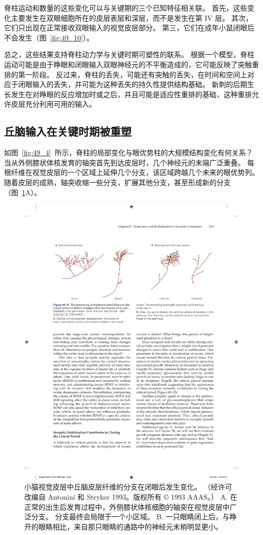 脊柱运动和数量的这些变化可以与关键期的三个已知特征相关联。
首先，这些变化主要发生在双眼细胞所在的皮层表层和深层，而不是发生在第 IV 层。
其次，它们只出现在正常接收双眼输入的视觉皮层部分。
第三，它们在成年小鼠闭眼后不会发生（图~\ref{fig:49_10}）。


总之，这些结果支持脊柱动力学与关键时期可塑性的联系。
根据一个模型，脊柱运动可能是由于睁眼和闭眼输入双眼神经元的不平衡造成的，它可能反映了突触重排的第一阶段。
反过来，脊柱的丢失，可能还有突触的丢失，在时间和空间上对应于闭眼输入的丢失，并可能为这种丢失的持久性提供结构基础。
新刺的后期生长发生在对睁眼的反应增加时或之后，并且可能是适应性重排的基础，这种重排允许皮层充分利用可用的输入。



\subsection{丘脑输入在关键时期被重塑}

如图~\ref{fig:49_4}~所示，脊柱的局部变化与眼优势柱的大规模结构变化有何关系？
当从外侧膝状体核发育的轴突首先到达皮层时，几个神经元的末端广泛重叠。
每根纤维在视觉皮层的一个区域上延伸几个分支，该区域跨越几个未来的眼优势列。
随着皮层的成熟，轴突收缩一些分支，扩展其他分支，甚至形成新的分支（图~\ref{fig:49_11}A）。


\begin{figure}[htbp]
	\centering
	\includegraphics[width=0.95\linewidth]{chap49/fig_49_11}
	\caption{小猫视觉皮层中丘脑皮层纤维的分支在闭眼后发生变化。 （经许可改编自 Antonini 和 Stryker 1993。版权所有 © 1993 AAAS。） A. 在正常的出生后发育过程中，外侧膝状体核细胞的轴突在视觉皮层中广泛分支。 分支最终会局限于一个小区域。 B. 一只眼睛闭上后，与睁开的眼睛相比，来自那只眼睛的通路中的神经元末梢明显更小。}
	\label{fig:49_11}
\end{figure}



